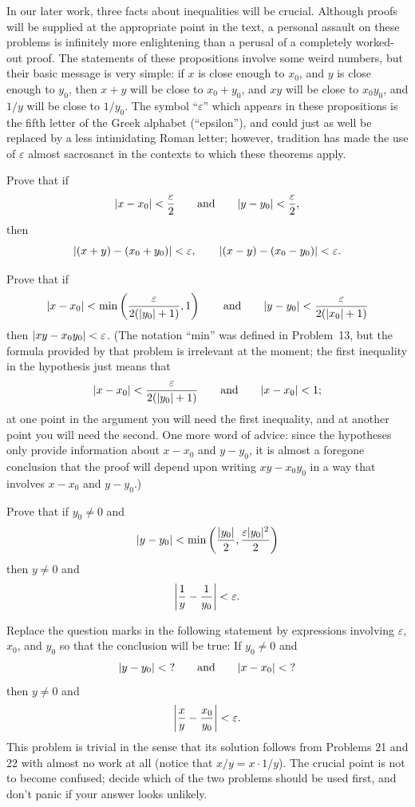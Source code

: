 In our later work, three facts about inequalities will be crucial. Although
proofs will be supplied at the appropriate point in the text, a personal
assault on these problems is infinitely more enlightening than a perusal of a
completely worked-out proof. The statements of these propositions involve
some weird numbers, but their basic message is very simple: if $x$ is close
enough to $x_0$, and $y$ is close enough to $y_0$, then $x+y$ will be close to
$x_0 + y_0$, and $xy$ will be close to $x_0 y_0$, and $1/y$ will be close to
$1/y_0$. The symbol ``$\varepsilon$'' which appears in these propositions is
the fifth letter of the Greek alphabet (``epsilon''), and could just as well
be replaced by a less intimidating Roman letter; however, tradition has made
the use of $\varepsilon$ almost sacrosanct in the contexts to which these
theorems apply.

 Prove that if
\[
\abs{x - x_0} < \frac{\varepsilon}{2}
\qquad\text{and}\qquad
\abs{y - y_0} < \frac{\varepsilon}{2},
\]
then
\[
\abs{(x+y) - (x_0+y_0)} < \varepsilon,
\qquad
\abs{(x-y) - (x_0-y_0)} < \varepsilon.
\]

 Prove that if
\[
\abs{x - x_0} < \min\left(\frac{\varepsilon}{2(\abs{y_0}+1)}, 1\right)
\qquad\text{and}\qquad
\abs{y - y_0} < \frac{\varepsilon}{2(\abs{x_0}+1)}
\]
then $\abs{xy - x_0 y_0} < \varepsilon$.
(The notation ``min'' was defined in Problem~13, but the formula provided by
that problem is irrelevant at the moment; the first inequality in the
hypothesis just means that
\[
\abs{x - x_0} < \frac{\varepsilon}{2(\abs{y_0}+1)}
\qquad\text{and}\qquad
\abs{x - x_0} < 1;
\]
at one point in the argument you will need the first inequality, and at
another point you will need the second. One more word of advice: since the
hypotheses only provide information about $x - x_0$ and $y - y_0$, it is
almost a foregone conclusion that the proof will depend upon writing
$xy - x_0 y_0$ in a way that involves $x - x_0$ and $y - y_0$.)

 Prove that if $y_0 \neq 0$ and
\[
\abs{y - y_0} < \min\left(\frac{\abs{y_0}}{2}, \frac{\varepsilon \abs{y_0}^2}{2}\right)
\]
then $y \neq 0$ and
\[
\abs*{\frac{1}{y} - \frac{1}{y_0}} < \varepsilon.
\]

 Replace the question marks in the following statement by
expressions involving $\varepsilon$, $x_0$, and $y_0$ so that the conclusion
will be true:
If $y_0 \neq 0$ and
\[
\abs{y - y_0} < \text{?} \qquad\text{and}\qquad \abs{x - x_0} < \text{?}
\]
then $y \neq 0$ and
\[
\abs*{\frac{x}{y} - \frac{x_0}{y_0}} < \varepsilon.
\]
This problem is trivial in the sense that its solution follows from Problems
21 and 22 with almost no work at all (notice that $x/y = x \cdot 1/y$). The
crucial point is not to become confused; decide which of the two problems
should be used first, and don't panic if your answer looks unlikely.

